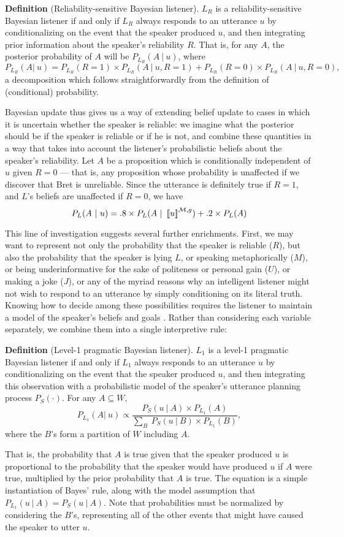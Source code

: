 \documentclass[12pt]{article}
\newcommand{\llbracket}{\ensuremath{\left [\!\left [}}%
\newcommand{\rrbracket}{\ensuremath{\right ]\!\right ]}}
\providecommand{\sv}[1]{\ensuremath{\llbracket #1 \rrbracket}}
\newcounter{definition}
\newcommand{\defin}[2]{
\vspace{.1in}
\noindent \textbf{Definition \arabic{definition}} (#1). #2
\vspace{.1in}
\addtocounter{definition}{1}
}
\begin{document}
\defin{Reliability-sensitive Bayesian listener}{
$L_R$ is a reliability-sensitive Bayesian listener if and only if $L_R$ always responds to an utterance $u$ by conditionalizing on the event that the speaker produced $u$, and then integrating prior information about the speaker's reliability $R$. That is, for any $A$, the posterior probability of $A$ will be $P_{L_R}(A\ |\ u)$, where
$$
P_{L_R}(A |\ u) = P_{L_R}(R=1) \times P_{L_R}(A \ |\ u, R=1) + P_{L_R}(R=0) \times P_{L_R}(A\ |\ u, R=0),
$$
a decomposition which follows straightforwardly from the definition of (conditional) probability. 
}

Bayesian update thus gives us a way of extending belief update to cases in which it is uncertain whether the speaker is reliable: we imagine what the posterior should be if the speaker is reliable or if he is not, and combine these quantities in a way that takes into account the listener's probabilistic beliefs about the speaker's reliability. Let $A$ be a proposition which is conditionally independent of $u$ given $R=0$ --- that is, any proposition whose probability is unaffected if we discover that Bret is unreliable. Since the utterance is definitely true if $R=1$, and $L$'s beliefs are unaffected if $R=0$, we have
$$
P_L(A\ |\ u) = .8 \times P_L(A \ |\ \sv{u}^{\mathcal{M},g}) + .2 \times P_L(A)
$$
%
%

This line of investigation suggests several further enrichments. First, we may want to represent not only the probability that the speaker is reliable ($R$), but also the probability that the speaker is lying $L$, or speaking metaphorically ($M$), or being underinformative for the sake of politeness or personal gain ($U$), or making a joke ($J$), or any of the myriad reasons why an intelligent listener might not wish to respond to an utterance by simply conditioning on its literal truth. Knowing how to decide among these possibilities requires the listener to maintain a model of the speaker's beliefs and goals \citep[][etc.]{grice89,lewis69,clark96}. Rather than considering each variable separately, we combine them into a single interpretive rule:

\defin{Level-1 pragmatic Bayesian listener}{$L_1$ is a level-1 pragmatic Bayesian listener if and only if $L_1$ always responds to an utterance $u$ by conditionalizing on the event that the speaker produced $u$, and then integrating this observation with a probabilistic model of the speaker's utterance planning process $P_{S}(\cdot)$. For any $A \subseteq W$, 
$$
P_{L_1}(A |\ u) \propto \frac{P_{S}(u \ |\ A) \times P_{L_1}(A)}{\sum_B\ P_{S}(u \ |\ B) \times P_{L_1}(B)},
$$
where the $B$'s form a partition of $W$ including $A$.

That is, the probability that $A$ is true given that the speaker produced $u$ is proportional to the probability that the speaker would have produced $u$ if $A$ were true, multiplied by the prior probability that $A$ is true. The equation is a simple instantiation of Bayes' rule, along with the model assumption that $P_{L_1}(u \ |\ A) = P_{S}(u \ |\ A)$. Note that probabilities must be normalized by considering the $B$'s, representing all of the other events that might have caused the speaker to utter $u$.
}
\end{document}
